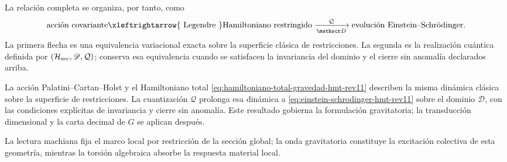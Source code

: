 La relación completa se organiza, por tanto, como
\[
 \text{acción covariante}
 \xleftrightarrow{\ \text{Legendre}\ }
 \text{Hamiltoniano restringido}
 \xrightarrow[\mathscr D]{\ \mathcal Q\ }
 \text{evolución Einstein--Schrödinger}.
\]
La primera flecha es una equivalencia variacional exacta sobre la superficie
clásica de restricciones. La segunda es la realización cuántica definida por
\((\mathcal H_{\rm sec},\mathscr D,\mathcal Q)\); conserva esa equivalencia
cuando se satisfacen la invariancia del dominio y el cierre sin anomalía
declarados arriba.

\begin{exactbox}[title={Resultado variacional y canónico}]
La acción Palatini--Cartan--Holst y el Hamiltoniano total
\eqref{eq:hamiltoniano-total-gravedad-hmt-rev11} describen la misma dinámica
clásica sobre la superficie de restricciones. La cuantización
\(\mathcal Q\) prolonga esa dinámica a
\eqref{eq:einstein-schrodinger-hmt-rev11} sobre el dominio
\(\mathscr D\), con las condiciones explícitas de invariancia y cierre sin
anomalía. Este resultado gobierna la formulación gravitatoria; la
transducción dimensional y la carta decimal de \(G\) se aplican después.
\end{exactbox}

La lectura machiana fija el marco local por restricción de la sección global;
la onda gravitatoria constituye la excitación colectiva de esta geometría,
mientras la torsión algebraica absorbe la respuesta material local.
